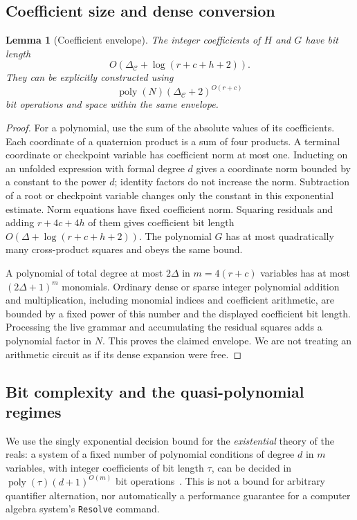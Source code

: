 \documentclass[11pt]{article}
\newtheorem{lemma}[theorem]{Lemma}
\theoremstyle{definition}
\theoremstyle{remark}
\newcommand{\poly}{\operatorname{poly}}
\newcommand{\code}[1]{\texttt{#1}}
\newcommand{\calC}{\mathcal C}
\begin{document}
\subsection{Coefficient size and dense conversion}
\begin{lemma}[Coefficient envelope]
\label{lem:bits}
The integer coefficients of $H$ and $G$ have bit length
\[
O\!\left(\Delta_{\calC}+\log(r+c+h+2)\right).
\]
They can be explicitly constructed using
\[
\poly(N)(\Delta_{\calC}+2)^{O(r+c)}
\]
bit operations and space within the same envelope.
\end{lemma}
\begin{proof}
For a polynomial, use the sum of the absolute values of its coefficients. Each coordinate of a quaternion product is a sum of four products. A terminal coordinate or checkpoint variable has coefficient norm at most one. Inducting on an unfolded expression with formal degree $d$ gives a coordinate norm bounded by a constant to the power $d$; identity factors do not increase the norm. Subtraction of a root or checkpoint variable changes only the constant in this exponential estimate. Norm equations have fixed coefficient norm. Squaring residuals and adding $r+4c+4h$ of them gives coefficient bit length $O(\Delta+\log(r+c+h+2))$. The polynomial $G$ has at most quadratically many cross-product squares and obeys the same bound.

A polynomial of total degree at most $2\Delta$ in $m=4(r+c)$ variables has at most $(2\Delta+1)^m$ monomials. Ordinary dense or sparse integer polynomial addition and multiplication, including monomial indices and coefficient arithmetic, are bounded by a fixed power of this number and the displayed coefficient bit length. Processing the live grammar and accumulating the residual squares adds a polynomial factor in $N$. This proves the claimed envelope. We are not treating an arithmetic circuit as if its dense expansion were free.
\end{proof}

\subsection{Bit complexity and the quasi-polynomial regimes}
We use the singly exponential decision bound for the \emph{existential} theory of the reals: a system of a fixed number of polynomial conditions of degree $d$ in $m$ variables, with integer coefficients of bit length $\tau$, can be decided in $\poly(\tau)(d+1)^{O(m)}$ bit operations~\cite{renegar,meesum}. This is not a bound for arbitrary quantifier alternation, nor automatically a performance guarantee for a computer algebra system's \code{Resolve} command.
\end{document}

